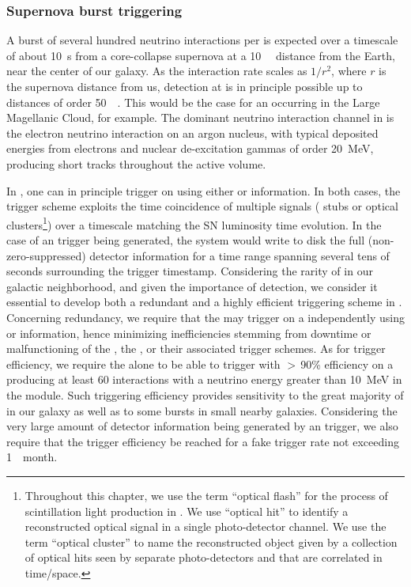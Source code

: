 \subsubsection{Supernova burst triggering}

A burst of several hundred neutrino interactions per  is expected over a timescale of about \SI{10}{\s} from a core-collapse supernova at a \SI{10}{\kilo\parsec} distance from the Earth, near the center of our galaxy. As the  interaction rate scales as $1/r^2$, where $r$ is the supernova distance from us,  detection at \dune is in principle possible up to distances of order \SI{50}{\kilo\parsec}. This would be the case for an  occurring in the Large Magellanic Cloud, for example. The dominant neutrino interaction channel in \dune is the  electron neutrino interaction on an argon nucleus, with typical deposited energies from electrons and nuclear de-excitation gammas of order \SI{20}{\MeV}, producing short tracks throughout the  active volume.

In \dune, one can in principle trigger on  using either  or  information. In both cases, the trigger scheme exploits the time coincidence of multiple signals ( stubs or  optical clusters\footnote{Throughout this chapter, we use the term ``optical flash'' for the process of scintillation light production in . We use ``optical hit'' to identify a reconstructed optical signal in a single photo-detector channel. We use the term ``optical cluster'' to name the reconstructed object given by a collection of optical hits seen by separate photo-detectors and that are correlated in time/space.}) over a timescale matching the SN luminosity time evolution. In the case of an  trigger being generated, the  system would write to disk the full (non-zero-suppressed) detector information for a time range spanning several tens of seconds surrounding the trigger timestamp. Considering the rarity of  in our galactic neighborhood, and given the importance of  detection, we consider it essential to develop both a redundant and a highly efficient  triggering scheme in . Concerning redundancy, we require that the \dune {} may trigger on a  independently using  or  information, hence minimizing  inefficiencies stemming from downtime or malfunctioning of the , the , or their associated trigger schemes. As for trigger efficiency, we require the  alone to be able to trigger with $>\,$90\% efficiency on a  producing at least 60 interactions with a neutrino energy greater than \SI{10}{MeV} in the   module. Such triggering efficiency provides sensitivity to the great majority of  in our galaxy  as well as to  some bursts in small nearby galaxies. Considering the very large amount of detector information being generated by an  trigger, we also require that the  trigger efficiency be reached for a  fake trigger rate not exceeding \SI{1}{\per month}.

